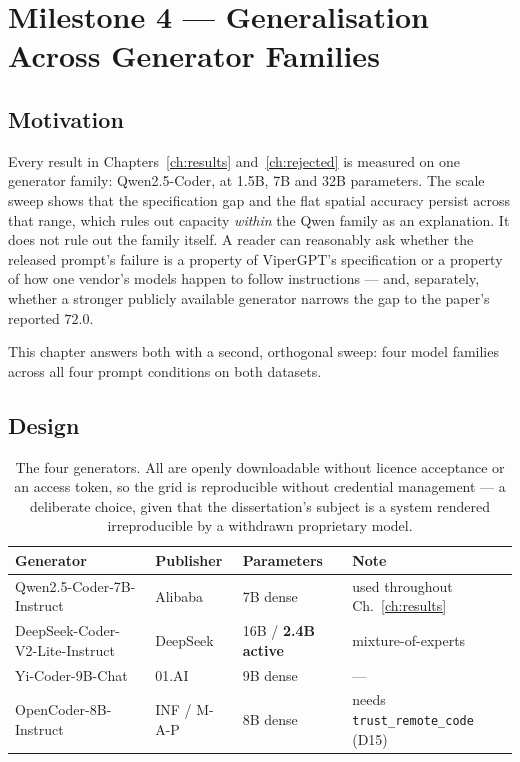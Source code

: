 %  
\chapter{Milestone 4 --- Generalisation Across Generator Families}
\label{ch:milestone4}

\section{Motivation}

Every result in Chapters~\ref{ch:results} and~\ref{ch:rejected} is measured on one
generator family: Qwen2.5-Coder, at 1.5B, 7B and 32B parameters. The scale sweep
shows that the specification gap and the flat spatial accuracy persist across that
range, which rules out capacity \emph{within} the Qwen family as an explanation. It
does not rule out the family itself. A reader can reasonably ask whether the released
prompt's failure is a property of ViperGPT's specification or a property of how one
vendor's models happen to follow instructions --- and, separately, whether a stronger
publicly available generator narrows the gap to the paper's reported $72.0$.

This chapter answers both with a second, orthogonal sweep: four model families across
all four prompt conditions on both datasets.

\section{Design}

\begin{table}[htbp]\centering\small
\caption{The four generators. All are openly downloadable without licence acceptance
or an access token, so the grid is reproducible without credential management --- a
deliberate choice, given that the dissertation's subject is a system rendered
irreproducible by a withdrawn proprietary model.}
\label{tab:m4-models}
\begin{tabular}{@{}llll@{}}
\toprule
\textbf{Generator} & \textbf{Publisher} & \textbf{Parameters} & \textbf{Note} \\
\midrule
Qwen2.5-Coder-7B-Instruct & Alibaba & 7B dense & used throughout Ch.~\ref{ch:results} \\
DeepSeek-Coder-V2-Lite-Instruct & DeepSeek & 16B / \textbf{2.4B active} & mixture-of-experts \\
Yi-Coder-9B-Chat & 01.AI & 9B dense & --- \\
OpenCoder-8B-Instruct & INF / M-A-P & 8B dense & needs \texttt{trust\_remote\_code} (D15) \\
\bottomrule
\end{tabular}
\end{table}

